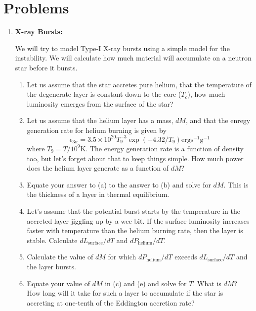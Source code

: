 \section{Problems}
\begin{enumerate}
\item{\bf X-ray Bursts:}

We will try to model Type-I X-ray bursts using a simple model for the instability. We will calculate how much material will accumulate on a neutron star before it bursts.
\begin{enumerate}
\item Let us assume that the star accretes pure helium, that the
  temperature of the degenerate layer is constant down to the core
  ($T_c$), how much luminosity emerges from the surface of the star? 

\item Let us assume that the helium layer has a mass, $dM$, and that the enregy generation rate for helium burning is given by
$$
\epsilon_{3\alpha} = 3.5 \times 10^{20} T_9^{-3} \exp(-4.32/T_9) \mathrm{erg s}^{-1} \mathrm{g}^{-1}
$$
where $T_9=T/10^9 \mathrm{K}$. The energy generation rate is a
function of density too, but let's forget about that to keep things
simple. How much power does the helium layer generate as a function of
$dM$?

\item Equate your answer to (a) to the answer to (b) and solve for
  $dM$. This is the thickness of a layer in thermal equilibrium.

\item Let's assume that the potential burst starts by the temperature
  in the accreted layer jiggling up by a wee bit. If the surface
  luminosity increases faster with temperature than the helium burning
  rate, then the layer is stable. Calculate $dL_\mathrm{surface}/dT$ and
  $dP_\mathrm{helium}/dT$.

\item Calculate the value of $dM$ for which $dP_\mathrm{helium}/dT$
  exceeds $dL_\mathrm{surface}/dT$ and the layer bursts.

\item Equate your value of $dM$ in (c) and (e) and solve for $T$. What
  is $dM$? How long will it take for such a layer to accumulate if the
  star is accreting at one-tenth of the Eddington accretion rate?

\end{enumerate}
\end{enumerate}
